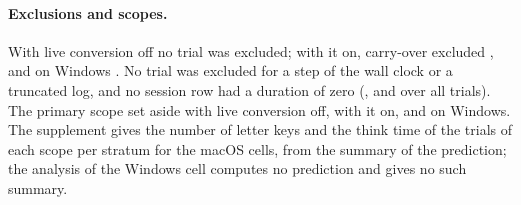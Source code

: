 \paragraph{Exclusions and scopes.} With live conversion off no trial was excluded; with it on, carry-over excluded
, and on Windows . No trial was excluded for a step
of the wall clock or a truncated log, and no session row had a duration of zero
(,  and
 over all trials). The primary scope set aside
 with live conversion off,  with
it on, and  on Windows. The supplement gives the number of letter keys and the
think time of the trials of each scope per stratum for the macOS cells, from the summary of the prediction; the analysis
of the Windows cell computes no prediction and gives no such summary.


